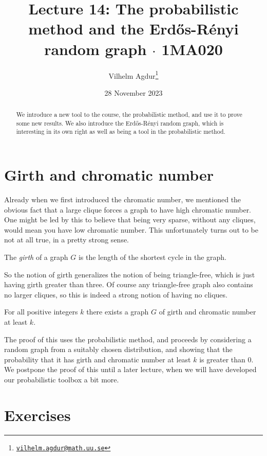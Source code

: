 \documentclass[nobib]{tufte-handout}
\title{Lecture 14: The probabilistic method and the Erd\H{o}s-Rényi random graph $\cdot$ 1MA020}
\author[Vilhelm Agdur]{Vilhelm Agdur\thanks{\href{mailto:vilhelm.agdur@math.uu.se}{\nolinkurl{vilhelm.agdur@math.uu.se}}}}
\date{28 November 2023}
\begin{document}
\maketitle%

\begin{abstract}
\noindent
We introduce a new tool to the course, the probabilistic method, and use it to prove some new results. We also introduce the Erd\H{o}s-Rényi random graph, which is interesting in its own right as well as being a tool in the probabilistic method.
\end{abstract}

\section{Girth and chromatic number}

Already when we first introduced the chromatic number, we mentioned the obvious fact that a large clique forces a graph to have high chromatic number. One might be led by this to believe that being very sparse, without any cliques, would mean you have low chromatic number. This unfortunately turns out to be not at all true, in a pretty strong sense.

\begin{definition}
  The \emph{girth} of a graph $G$ is the length of the shortest cycle in the graph.
\end{definition}

So the notion of girth generalizes the notion of being triangle-free, which is just having girth greater than three. Of course any triangle-free graph also contains no larger cliques, so this is indeed a strong notion of having no cliques.

\begin{theorem}[Erd\H{o}s, 1959]
  For all positive integers $k$ there exists a graph $G$ of girth and chromatic number at least $k$.
\end{theorem}

The proof of this uses the probabilistic method, and proceeds by considering a random graph from a suitably chosen distribution, and showing that the probability that it has girth and chromatic number at least $k$ is greater than $0$. We postpone the proof of this until a later lecture, when we will have developed our probabilistic toolbox a bit more.


\section{Exercises}


%
%
\end{document}
